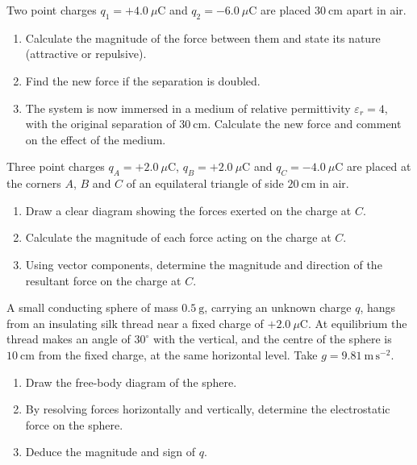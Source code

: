 \documentclass[11pt]{article}
\begin{document}
\begin{exercice}
Two point charges $q_{1} = +4.0\ \mu\mathrm{C}$ and $q_{2} = -6.0\ \mu\mathrm{C}$ are placed $30\ \mathrm{cm}$ apart in air.
\begin{enumerate}
\item Calculate the magnitude of the force between them and state its nature (attractive or repulsive).
\item Find the new force if the separation is doubled.
\item The system is now immersed in a medium of relative permittivity $\varepsilon_{r} = 4$, with the original separation of $30\ \mathrm{cm}$. Calculate the new force and comment on the effect of the medium.
\end{enumerate}
\end{exercice}

\begin{exercice}
Three point charges $q_{A} = +2.0\ \mu\mathrm{C}$, $q_{B} = +2.0\ \mu\mathrm{C}$ and $q_{C} = -4.0\ \mu\mathrm{C}$ are placed at the corners $A$, $B$ and $C$ of an equilateral triangle of side $20\ \mathrm{cm}$ in air.
\begin{enumerate}
\item Draw a clear diagram showing the forces exerted on the charge at $C$.
\item Calculate the magnitude of each force acting on the charge at $C$.
\item Using vector components, determine the magnitude and direction of the resultant force on the charge at $C$.
\end{enumerate}
\end{exercice}

\begin{exercice}
A small conducting sphere of mass $0.5\ \mathrm{g}$, carrying an unknown charge $q$, hangs from an insulating silk thread near a fixed charge of $+2.0\ \mu\mathrm{C}$. At equilibrium the thread makes an angle of $30^{\circ}$ with the vertical, and the centre of the sphere is $10\ \mathrm{cm}$ from the fixed charge, at the same horizontal level. Take $g = 9.81\ \mathrm{m\,s^{-2}}$.
\begin{enumerate}
\item Draw the free-body diagram of the sphere.
\item By resolving forces horizontally and vertically, determine the electrostatic force on the sphere.
\item Deduce the magnitude and sign of $q$.
\end{enumerate}
\end{exercice}
\end{document}
